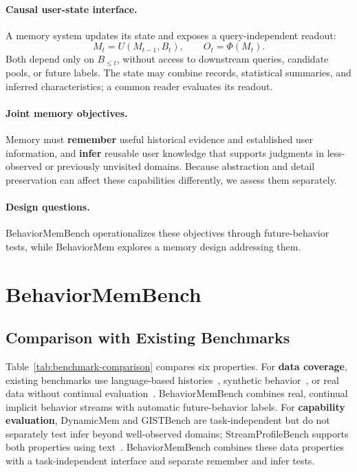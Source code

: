 \documentclass[sigconf,nonacm,balance=false]{acmart}
\begin{document}
\paragraph{\textbf{Causal user-state interface.}}
A memory system updates its state and exposes a query-independent readout:
\begin{equation}
    M_t=U(M_{t-1},B_t),\qquad O_t=\Phi(M_t).
\end{equation}
Both depend only on $B_{\leq t}$, without access to downstream queries, candidate pools, or future labels. The state may combine records, statistical summaries, and inferred characteristics; a common reader evaluates its readout.

\paragraph{\textbf{Joint memory objectives.}}
Memory must \textbf{remember} useful historical evidence and established user information, and \textbf{infer} reusable user knowledge that supports judgments in less-observed or previously unvisited domains. Because abstraction and detail preservation can affect these capabilities differently, we assess them separately.

\paragraph{\textbf{Design questions.}}
BehaviorMemBench operationalizes these objectives through future-behavior tests, while BehaviorMem explores a memory design addressing them.

\section{BehaviorMemBench}
\label{sec:benchmark}


\subsection{Comparison with Existing Benchmarks}
\label{sec:benchmark-comparison}

Table~\ref{tab:benchmark-comparison} compares six properties. For \textbf{data coverage}, existing benchmarks use language-based histories~\citep{maharana2024evaluatinglongtermconversationalmemory,wu2025longmemevalbenchmarkingchatassistants,hu2026evaluatingmemoryllmagents}, synthetic behavior~\citep{xie2026dynamicmemlonghorizonmemorybenchmark}, or real data without continual evaluation~\citep{salemi2024lamplargelanguagemodels,fostiropoulos2026gistbenchevaluatingllmuser}. BehaviorMemBench combines real, continual implicit behavior streams with automatic future-behavior labels. For \textbf{capability evaluation}, DynamicMem and GISTBench are task-independent but do not separately test infer beyond well-observed domains; StreamProfileBench supports both properties using text~\citep{wang2026streamprofilebenchbenchmarkfinegraineduser}. BehaviorMemBench combines these data properties with a task-independent interface and separate remember and infer tests.
\end{document}
